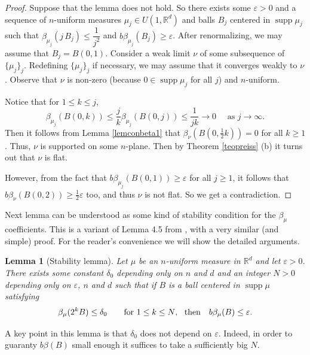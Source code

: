 \documentclass[11pt]{amsart}
\newcommand{\R}{{\mathbb R}}       %
\newcommand{\supp}{\operatorname{supp}}
\newcommand{\ve}{{\varepsilon}}
\newcommand{\vv}{{\vspace{2mm}}}
\newtheorem{lemma}[theorem]{Lemma}
\theoremstyle{definition}
\theoremstyle{remark}
\numberwithin{equation}{section}
\begin{document}
\begin{proof}
Suppose that the lemma does not hold. So
there exists some $\ve>0$ and a sequence of $n$-uniform measures $\mu_j\in U(1,\R^d)$ and balls
$B_j$ centered in $\supp\mu_j$ such that
$\beta_{\mu_j}(j\,B_j)\leq \dfrac1{j^2}$ and $b\beta_{\mu_j}(B_j)\geq\ve$. After renormalizing, we may assume that $B_j=B(0,1)$. 
Consider a weak limit $\nu$ of some subsequence of $\{\mu_j\}_j$. Redefining $\{\mu_j\}_j$ if
necessary, we may assume that it converges weakly to $\nu$. Observe that $\nu$ is non-zero (because $0\in\supp\mu_j$ for all $j$) and $n$-uniform.

Notice that for $1\leq k\leq j$, 
$$\beta_{\mu_j}(B(0,k))\leq \frac jk \beta_{\mu_j}(B(0,j))\leq \frac1{jk}\to 0\quad \mbox{ as $j\to\infty$.}$$
Then it follows from Lemma \ref{lemconbeta1} that $\beta_\nu(B(0,\frac12k))=0$ for all $k\geq1$. Thus, $\nu$ is supported on some $n$-plane.  Then by Theorem \ref{teopreiss} (b) it turns out that $\nu$ is flat.

However, from the fact that $b\beta_{\mu_j}(B(0,1))\geq\ve$ for all $j\geq1$, it follows that
$b\beta_{\nu}(B(0,2))\geq\frac12\ve$ too, and thus $\nu$ is not flat. So we get a contradiction.
\end{proof}

\vv
 Next lemma can be understood
as some kind of stability condition for the $\beta_\mu$ coefficients. This is a variant of Lemma 4.5 from
\cite{PTT}, with a very similar (and simple) proof. For the reader's convenience we will show the detailed
arguments.



\begin{lemma}[Stability lemma]\label{lemstable}
Let $\mu$ be an $n$-uniform measure in $\R^d$ and let $\ve>0$. 
 There exists some constant
$\delta_0$ depending only on $n$ and $d$ and
an integer $N>0$ depending only on 
$\ve$, $n$ and $d$ such that if $B$ is a ball centered in  $\supp\mu$ satisfying 
\begin{equation}\label{eql79}
\beta_{\mu}(2^kB)\leq \delta_0\qquad \mbox{for $1\leq k\leq N$},\ \
\hbox{then }\ \ b\beta_{\mu}(B)\leq\ve.
\end{equation}
\end{lemma}

\vv
A key point in this lemma is that $\delta_0$ does not depend on $\ve$. Indeed, in order to guaranty
$b\beta(B)$ small enough it suffices to take a sufficiently big $N$.


\vv
\end{document}
